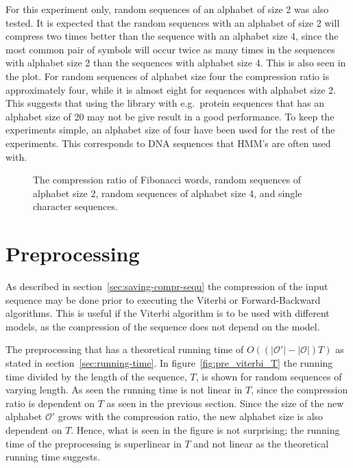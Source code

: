 For this experiment only, random sequences of an alphabet of size 2 was also
tested. It is expected that the random sequences with an alphabet of size 2
will compress two times better than the sequence with an alphabet size 4, since
the most common pair of symbols will occur twice as many times in the sequences
with alphabet size 2 than the sequences with alphabet size 4. This is also seen
in the plot. For random sequences of alphabet size four the compression ratio
is approximately four, while it is almost eight for sequences with alphabet
size 2. This suggests that using the library with e.g.\ protein sequences that
has an alphabet size of 20 may not be give result in a good performance. To
keep the experiments simple, an alphabet size of four have been used for the
rest of the experiments. This corresponds to DNA sequences that HMM's are often
used with.

\begin{figure}
  \centering
  
  \caption{The compression ratio of Fibonacci words, random sequences of
    alphabet size 2, random sequences of alphabet size 4, and single character
    sequences.}
  \label{fig:compression_ratio}
\end{figure}

\section{Preprocessing}

As described in section~\ref{sec:saving-compr-sequ} the compression of the
input sequence may be done prior to executing the Viterbi or Forward-Backward
algorithms. This is useful if the Viterbi algorithm is to be used with different
models, as the compression of the sequence does not depend on the model.

The preprocessing that has a theoretical running time of
$O( ( \lvert\mathcal{O'}\rvert - \lvert{\mathcal{O}}\rvert ) T)$ as
stated in section~\ref{sec:running-time}. In figure~\ref{fig:pre_viterbi_T} the
running time divided by the length of the sequence, $T$, is shown for random
sequences of varying length. As seen the running time is not linear in $T$,
since the compression ratio is dependent on $T$ as seen in the previous
section. Since the size of the new alphabet $\mathcal{O'}$ grows with the
compression ratio, the new alphabet size is also dependent on $T$. Hence, what
is seen in the figure is not surprising; the running time of the preprocessing
is superlinear in $T$ and not linear as the theoretical running time suggests.

